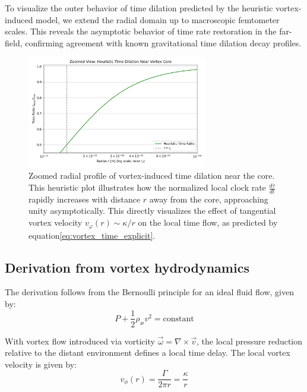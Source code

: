 To visualize the outer behavior of time dilation predicted by the heuristic vortex-induced model, we extend the radial domain up to macroscopic femtometer scales. This reveals the asymptotic behavior of time rate restoration in the far-field, confirming agreement with known gravitational time dilation decay profiles.

\begin{figure}[H]
    \centering
    \includegraphics[width=0.7\textwidth]{06-HeuristicTimeDilation4}
    \caption{
        Zoomed radial profile of vortex-induced time dilation near the core.
        This heuristic plot illustrates how the normalized local clock rate
        $\frac{d\tau}{dt}$ rapidly increases with distance $r$ away from the core,
        approaching unity asymptotically. This directly visualizes the effect of
        tangential vortex velocity $v_\varphi(r) \sim \kappa / r$ on the local time flow,
        as predicted by equation\eqref{eq:vortex_time_explicit}.
    }
    \label{fig:HeuristicTimeDilation}
\end{figure}

\subsection{Derivation from vortex hydrodynamics}

The derivation follows from the Bernoulli principle for an ideal fluid flow, given by:
\begin{equation}\label{eq:Bernoulli}
P + \frac{1}{2}\rho_\text{\ae} v^2 = \text{constant}
\end{equation}

With vortex flow introduced via vorticity $\vec{\omega} = \nabla \times \vec{v}$, the local pressure reduction relative to the distant environment defines a local time delay. The local vortex velocity is given by:
\begin{equation}\label{eq:tangential_velocity}
v_{\phi}(r) = \frac{\Gamma}{2\pi r} = \frac{\kappa}{r}
\end{equation}

